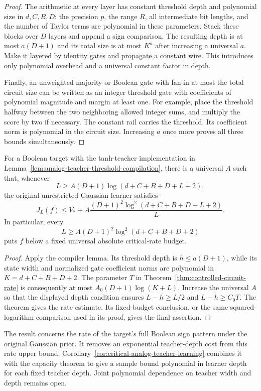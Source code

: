 \begin{proof}
The arithmetic at every layer has constant threshold depth and
polynomial size in $d,C,B,D$: the precision $p$, the range $R$, all
intermediate bit lengths, and the number of Taylor terms are polynomial
in these parameters. Stack these blocks over $D$ layers and append a
sign comparison. The resulting depth is at most $a(D+1)$ and its
total size is at most $K^a$ after increasing a universal $a$.
Make it layered by identity gates and propagate a constant wire.
This introduces only polynomial overhead and a universal constant
factor in depth.

Finally, an unweighted majority or Boolean gate with fan-in at most
the total circuit size can be written as an integer threshold gate
with coefficients of polynomial magnitude and margin at least one.
For example, place the threshold halfway between the two neighboring
allowed integer sums, and multiply the score by two if necessary.
The constant rail carries the threshold. Its coefficient norm is
polynomial in the circuit size. Increasing $a$ once more proves all
three bounds simultaneously.
\end{proof}

\begin{corollary}
\label{cor:analog-teacher-critical-rate}
For a Boolean target with the tanh-teacher implementation in
Lemma~\ref{lem:analog-teacher-threshold-compilation}, there is a
universal $A$ such that, whenever
\[
 L\ge A(D+1)\log(d+C+B+D+L+2),
\]
the original unrestricted Gaussian learner satisfies
\[
 J_L(f)\le V_*+
 A\frac{(D+1)^2\log^2(d+C+B+D+L+2)}L.
\]
In particular, every
\[
 L\ge A(D+1)^2\log^2(d+C+B+D+2)
\]
puts $f$ below a fixed universal absolute critical-rate budget.
\end{corollary}

\begin{proof}
Apply the compiler lemma. Its threshold depth is $h\le a(D+1)$,
while its state width and normalized gate coefficient norms are
polynomial in $K=d+C+B+D+2$.
The parameter $T$ in Theorem~\ref{thm:controlled-circuit-rate}
is consequently at most $A_0(D+1)\log(K+L)$.
Increase the universal $A$ so that the displayed depth condition
ensures $L-h\ge L/2$ and $L-h\ge C_0T$.
The theorem gives the rate estimate. Its fixed-budget conclusion,
or the same squared-logarithm comparison used in its proof, gives
the final assertion.
\end{proof}

The result concerns the rate of the target's full Boolean sign pattern
under the original Gaussian prior. It removes an exponential
teacher-depth cost from this rate upper bound. Corollary~\ref{cor:critical-analog-teacher-learning} combines it with
the capacity theorem to give a sample bound polynomial in learner depth
for each fixed teacher depth. Joint polynomial dependence on teacher
width and depth remains open.
